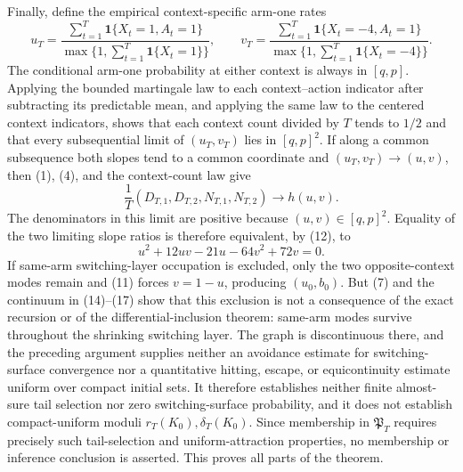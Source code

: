 Finally, define the empirical context-specific arm-one rates
\[
 u_T=\frac{\sum_{t=1}^T\mathbf1\{X_t=1,A_t=1\}}
 {\max\{1,\sum_{t=1}^T\mathbf1\{X_t=1\}\}},\qquad
 v_T=\frac{\sum_{t=1}^T\mathbf1\{X_t=-4,A_t=1\}}
 {\max\{1,\sum_{t=1}^T\mathbf1\{X_t=-4\}\}}.
\]
The conditional arm-one probability at either context is always in \([q,p]\).  Applying the bounded martingale law to each context--action indicator after subtracting its predictable mean, and applying the same law to the centered context indicators, shows that each context count divided by \(T\) tends to \(1/2\) and that every subsequential limit of \((u_T,v_T)\) lies in \([q,p]^2\).  If along a common subsequence both slopes tend to a common coordinate and \((u_T,v_T)\to(u,v)\), then (1), (4), and the context-count law give
\[
 \frac1T(D_{T,1},D_{T,2},N_{T,1},N_{T,2})\longrightarrow h(u,v).
\]
The denominators in this limit are positive because \((u,v)\in[q,p]^2\).  Equality of the two limiting slope ratios is therefore equivalent, by (12), to
\[
 u^2+12uv-21u-64v^2+72v=0.
\]
If same-arm switching-layer occupation is excluded, only the two opposite-context modes remain and (11) forces \(v=1-u\), producing \((u_0,b_0)\).  But (7) and the continuum in (14)--(17) show that this exclusion is not a consequence of the exact recursion or of the differential-inclusion theorem: same-arm modes survive throughout the shrinking switching layer.  The graph is discontinuous there, and the preceding argument supplies neither an avoidance estimate for switching-surface convergence nor a quantitative hitting, escape, or equicontinuity estimate uniform over compact initial sets.  It therefore establishes neither finite almost-sure tail selection nor zero switching-surface probability, and it does not establish compact-uniform moduli \(r_T(K_0),\delta_T(K_0)\).  Since membership in \(\mathfrak P_T\) requires precisely such tail-selection and uniform-attraction properties, no membership or inference conclusion is asserted.  This proves all parts of the theorem.